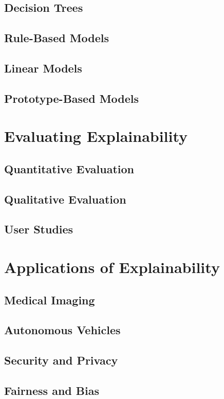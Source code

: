 \subsection{Decision Trees}
\subsection{Rule-Based Models}
\subsection{Linear Models}
\subsection{Prototype-Based Models}
\section{Evaluating Explainability}
\subsection{Quantitative Evaluation}
\subsection{Qualitative Evaluation}
\subsection{User Studies}
\section{Applications of Explainability}
\subsection{Medical Imaging}
\subsection{Autonomous Vehicles}
\subsection{Security and Privacy}
\subsection{Fairness and Bias}